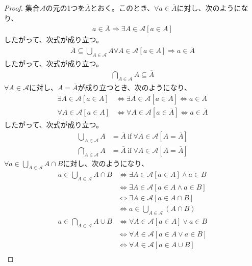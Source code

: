 \documentclass[a4paper]{jsarticle}
\begin{document}
\begin{proof}
集合$\mathcal{A}$の元の1つを$\overline{A}$とおく。このとき、$\forall a \in \overline{A}$に対し、次のようになり、
\begin{align*}
a \in \overline{A} \Rightarrow \exists A \in \mathcal{A}[ a \in A]
\end{align*}
したがって、次式が成り立つ。
\begin{align*}
\overline{A} \subseteq \bigcup_{A \in \mathcal{A}} A
\forall A \in \mathcal{A}[ a \in A] \Rightarrow a \in \overline{A}
\end{align*}
したがって、次式が成り立つ。
\begin{align*}
\bigcap_{A \in \mathcal{A}} A \subseteq \overline{A}
\end{align*}
$\forall A \in \mathcal{A}$に対し、$A = \overline{A}$が成り立つとき、次のようになり、
\begin{align*}
\exists A \in \mathcal{A}[ a \in A] &\Leftrightarrow \exists A \in \mathcal{A}\left[ a \in \overline{A} \right] \Leftrightarrow a \in \overline{A}\\
\forall A \in \mathcal{A}[ a \in A] &\Leftrightarrow \forall A \in \mathcal{A}\left[ a \in \overline{A} \right] \Leftrightarrow a \in \overline{A}
\end{align*}
したがって、次式が成り立つ。
\begin{align*}
\bigcup_{A \in \mathcal{A}} A &= \overline{A}\ \mathrm{if}\ \forall A \in \mathcal{A}\left[ A = \overline{A} \right]\\
\bigcap_{A \in \mathcal{A}} A &= \overline{A}\ \mathrm{if}\ \forall A \in \mathcal{A}\left[ A = \overline{A} \right]
\end{align*}
$\forall a \in \bigcup_{A \in \mathcal{A}} A \cap B$に対し、次のようになり、
\begin{align*}
a \in \bigcup_{A \in \mathcal{A}} A \cap B &\Leftrightarrow \exists A \in \mathcal{A}[ a \in A] \land a \in B\\
&\Leftrightarrow \exists A \in \mathcal{A}[ a \in A \land a \in B]\\
&\Leftrightarrow \exists A \in \mathcal{A}[ a \in A \cap B]\\
&\Leftrightarrow a \in \bigcup_{A \in \mathcal{A}} (A \cap B)\\
a \in \bigcap_{A \in \mathcal{A}} A \cup B &\Leftrightarrow \forall A \in \mathcal{A}[ a \in A] \vee a \in B\\
&\Leftrightarrow \forall A \in \mathcal{A}[ a \in A \vee a \in B]\\
&\Leftrightarrow \forall A \in \mathcal{A}[ a \in A \cup B]\\

\end{align*}
\end{proof}
\end{document}
